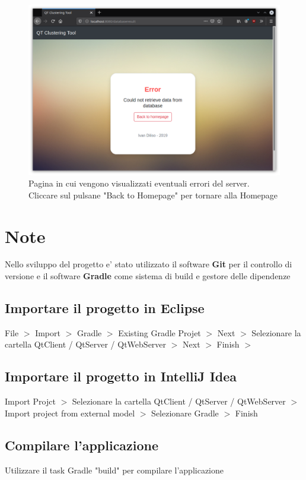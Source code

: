 \documentclass{article}
\begin{document}
    \begin{figure}[H]
        \includegraphics[scale=0.4]{ADDON8}
        \caption{Pagina in cui vengono visualizzati eventuali errori del 
        server. Cliccare sul pulsane "Back to Homepage" per tornare alla 
        Homepage}   
        \label{fig:12}
    \end{figure} 


    \section{Note}
    Nello sviluppo del progetto e' stato utilizzato il software 
    \textbf{Git} per il controllo di versione e il software 
    \textbf{Gradle} come sistema di build e gestore delle dipendenze
        \subsection{Importare il progetto in Eclipse}
        File $>$ Import $>$ Gradle $>$ Existing Gradle Projet $>$ Next $>$
        Selezionare la cartella QtClient / QtServer / QtWebServer $>$ Next $>$
        Finish
        $>$
        \subsection{Importare il progetto in IntelliJ  Idea}
        Import Projct $>$
         Selezionare la cartella QtClient / QtServer / QtWebServer 
         $>$
        Import project from external model $>$ Selezionare Gradle $>$ Finish 

        \subsection{Compilare l'applicazione}
        Utilizzare il task Gradle "build" per compilare l'applicazione





    



    
\end{document}
